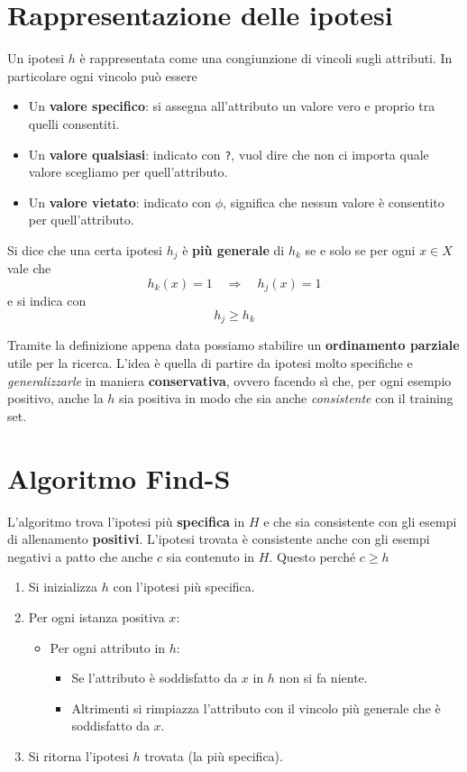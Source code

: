 \section{Rappresentazione delle ipotesi}
Un ipotesi $h$ \`e rappresentata come una congiunzione di vincoli sugli attributi. In particolare ogni vincolo pu\`o
essere
\begin{itemize}
	\item Un \textbf{valore specifico}: si assegna all'attributo un valore vero e proprio tra quelli consentiti.
	\item Un \textbf{valore qualsiasi}: indicato con \verb|?|, vuol dire che non ci importa quale valore
	      scegliamo per quell'attributo.
	\item Un \textbf{valore vietato}: indicato con $\phi$, significa che nessun valore \`e consentito per quell'attributo.
\end{itemize}

\begin{definition}
	Si dice che una certa ipotesi $h_j$ \`e \textbf{pi\`u generale} di $h_k$ se e solo se per ogni $x \in X$ vale che
	\[ h_k(x) = 1 \quad \Rightarrow \quad h_j(x) = 1 \]
	e si indica con
	\[ h_j \geq h_k \]
\end{definition}

Tramite la definizione appena data possiamo stabilire un \textbf{ordinamento parziale} utile per la ricerca.
L'idea \`e quella di partire da ipotesi molto specifiche e \emph{generalizzarle} in maniera \textbf{conservativa},
ovvero facendo s\`i che, per ogni esempio positivo, anche la $h$ sia positiva in modo che sia anche \emph{consistente}
con il training set.

\section{Algoritmo Find-S}
L'algoritmo trova l'ipotesi pi\`u \textbf{specifica} in $H$ e che sia consistente con gli esempi di allenamento
\textbf{positivi}. L'ipotesi trovata \`e consistente anche con gli esempi negativi a patto che anche $c$ sia
contenuto in $H$. Questo perch\'e $c \geq h$
\begin{enumerate}
	\item Si inizializza $h$ con l'ipotesi pi\`u specifica.
	\item Per ogni istanza positiva $x$:
	      \begin{itemize}
		      \item Per ogni attributo in $h$:
		            \begin{itemize}
			            \item Se l'attributo \`e soddisfatto da $x$ in $h$ non si fa niente.
			            \item Altrimenti si rimpiazza l'attributo con il vincolo pi\`u generale che \`e soddisfatto da
			                  $x$.
		            \end{itemize}
	      \end{itemize}
	\item Si ritorna l'ipotesi $h$ trovata (la pi\`u specifica).
\end{enumerate}

